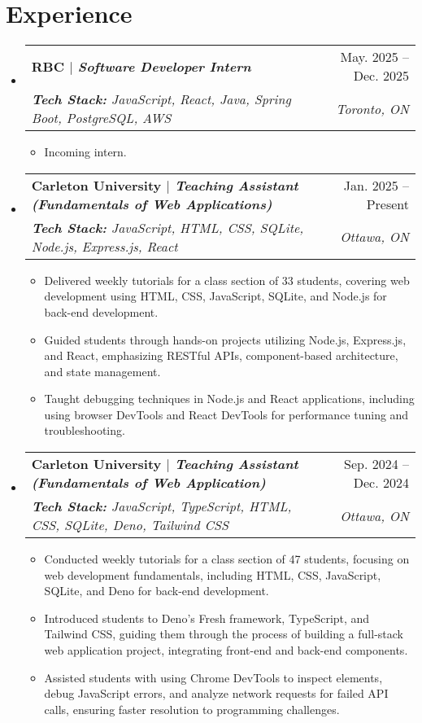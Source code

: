 \documentclass[letterpaper,11pt]{article}
\makeatletter
\newcommand{\resumeItem}[1]{
  \item\small{
    {#1 \vspace{-2pt}}
  }
}
\newcommand{\resumeSubheading}[4]{
  \vspace{-2pt}\item
    \begin{tabular*}{0.97\textwidth}[t]{l@{\extracolsep{\fill}}r}
      \textbf{\large#1} & #2 \\
      \textit{\normalsize#3} & \textit{\normalsize #4} \\
    \end{tabular*}\vspace{-7pt}
}
\newcommand{\resumeSubHeadingListStart}{\begin{itemize}[leftmargin=0.15in, label={}]}
\newcommand{\resumeSubHeadingListEnd}{\end{itemize}}
\newcommand{\resumeItemListStart}{\begin{itemize}}
\newcommand{\resumeItemListEnd}{\end{itemize}\vspace{-5pt}}
\makeatother
\begin{document}
\section{Experience}
\resumeSubHeadingListStart
    \resumeSubheading{RBC\textnormal{ $|$ \textit{Software Developer Intern}}}{May. 2025 -- Dec. 2025}
    {{\textbf{Tech Stack:} JavaScript, React, Java, Spring Boot, PostgreSQL, AWS}}{Toronto, ON}
        \resumeItemListStart    
            \resumeItem{Incoming intern.}
        \resumeItemListEnd
    
    \resumeSubheading{Carleton University\textnormal{ $|$ \textit {Teaching Assistant (Fundamentals of Web Applications)}}}{Jan. 2025 -- Present}
    {{\textbf{Tech Stack:} JavaScript, HTML, CSS, SQLite, Node.js, Express.js, React}}{Ottawa, ON}
        \resumeItemListStart
            \resumeItem{Delivered weekly tutorials for a class section of 33 students, covering web development using HTML, CSS,
            JavaScript, SQLite, and Node.js for back-end development.}
            \resumeItem{Guided students through hands-on projects utilizing Node.js, Express.js, and React, emphasizing RESTful APIs,
            component-based architecture, and state management.}
            \resumeItem{Taught debugging techniques in Node.js and React applications, including using browser DevTools and React
            DevTools for performance tuning and troubleshooting.}
        \resumeItemListEnd

    \resumeSubheading{Carleton University\textnormal{ $|$ \textit{Teaching Assistant (Fundamentals of Web Application)}}}{Sep. 2024 -- Dec. 2024}
    {{\textbf{Tech Stack:} JavaScript, TypeScript, HTML, CSS, SQLite, Deno, Tailwind CSS}}{Ottawa, ON}
        \resumeItemListStart
            \resumeItem{Conducted weekly tutorials for a class section of 47 students, focusing on web development fundamentals, including
            HTML, CSS, JavaScript, SQLite, and Deno for back-end development.}
            \resumeItem{Introduced students to Deno’s Fresh framework, TypeScript, and Tailwind CSS, guiding them through the process
            of building a full-stack web application project, integrating front-end and back-end components.}
            \resumeItem{Assisted students with using Chrome DevTools to inspect elements, debug JavaScript errors, and analyze network
            requests for failed API calls, ensuring faster resolution to programming challenges.}
        \resumeItemListEnd
\resumeSubHeadingListEnd

\end{document}

